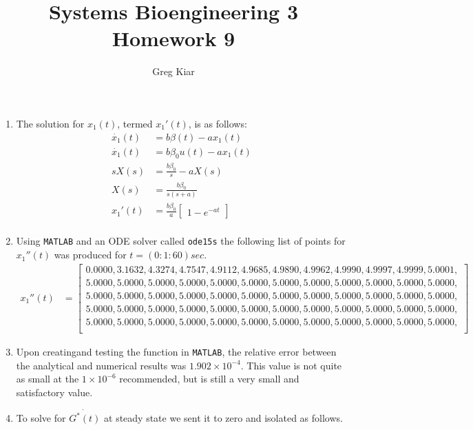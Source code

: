 \documentclass[10pt]{article}
\newcommand{\matlab}[1]{\texttt{#1}}
\newcommand{\bm}{\begin{bmatrix}}
\newcommand{\bb}{\end{bmatrix}}
\newcommand{\eul}[1]{e^{#1}}
\begin{document}
\title{ \vspace{-30mm}Systems Bioengineering 3\\Homework 9}
\author{Greg Kiar}

\maketitle
\begin{enumerate}
\item The solution for $x_1(t)$, termed $x_1'(t)$, is as follows:
\begin{align*}
\dot{x_1}(t) &= b \beta (t) - a x_1(t) \\
\dot{x_1}(t) &= b \beta_0 u(t) - a x_1(t) \\ 
sX(s) &= \frac{b \beta_0}{s} - aX(s) \\
X(s) &= \frac{b \beta_0}{s(s+a)} \\
x_1'(t) &= \frac{b \beta_0}{a} \bm 1 - \eul{-at} \bb \\
\end{align*}
\item Using \matlab{MATLAB} and an ODE solver called \matlab{ode15s} the following list of points for $x_1''(t)$ was produced for $t=(0:1:60) sec$.
\begin{align*}
x_1''(t) &= \bm 0.0000, 3.1632, 4.3274, 4.7547, 4.9112, 4.9685, 4.9890, 4.9962, 4.9990, 4.9997, 4.9999, 5.0001, \\
5.0000, 5.0000, 5.0000, 5.0000, 5.0000, 5.0000, 5.0000, 5.0000, 5.0000, 5.0000, 5.0000, 5.0000, \\
5.0000, 5.0000, 5.0000, 5.0000, 5.0000, 5.0000, 5.0000, 5.0000, 5.0000, 5.0000, 5.0000, 5.0000, \\
5.0000, 5.0000, 5.0000, 5.0000, 5.0000, 5.0000, 5.0000, 5.0000, 5.0000, 5.0000, 5.0000, 5.0000, \\
5.0000, 5.0000, 5.0000, 5.0000, 5.0000, 5.0000, 5.0000, 5.0000, 5.0000, 5.0000, 5.0000, 5.0000, \\\bb 
\end{align*}
\item Upon creatingand testing the function in \matlab{MATLAB}, the relative error between the analytical and numerical results was $1.902 \times 10^{-4}$. This value is not quite as small at the $1 \times 10^{-6}$ recommended, but is still a very small and satisfactory value.
\item To solve for $\dot{G^*(t)}$ at steady state we sent it to zero and isolated as follows. \\
\begin{align*}

\end{align*}
\end{enumerate}
\end{document}
